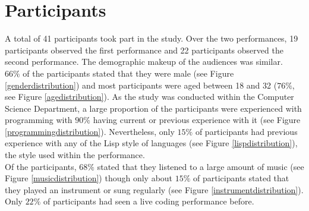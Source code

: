 

\section{Participants}

A total of 41 participants took part in the study. Over the two performances, 19 participants observed the first performance and 22 participants observed the second performance. The demographic makeup of the audiences was similar.\\

$66\%$ of the participants stated that they were male (see Figure \ref{genderdistribution}) and most participants were aged between 18 and 32 ($76\%$, see Figure \ref{agedistribution}). As the study was conducted within the Computer Science Department, a large proportion of the participants were experienced with programming with $90\%$ having current or previous experience with it (see Figure \ref{programmingdistribution}). Nevertheless, only $15\%$ of participants had previous experience with any of the Lisp style of languages (see Figure \ref{lispdistribution}), the style used within the performance.\\

Of the participants, $68\%$ stated that they listened to a large amount of music (see Figure \ref{musicdistribution}) though only about $15\%$ of participants stated that they played an instrument or sung regularly (see Figure \ref{instrumentdistribution}). Only $22\%$ of participants had seen a live coding performance before.


